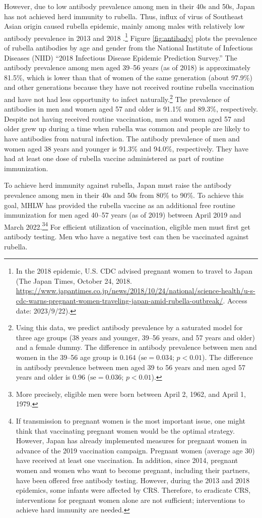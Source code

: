 \documentclass[
]{article}
\begin{document}
However, due to low antibody prevalence among men in their 40s and 50s, Japan has not achieved herd immunity to rubella. Thus, influx of virus of Southeast Asian origin caused rubella epidemic, mainly among males with relatively low antibody prevalence in 2013 and 2018 \citep{NIID2019}.\footnote{In the 2018 epidemic, U.S. CDC advised pregnant women to travel to Japan (The Japan Times, October 24, 2018. \url{https://www.japantimes.co.jp/news/2018/10/24/national/science-health/u-s-cdc-warns-pregnant-women-traveling-japan-amid-rubella-outbreak/}. Access date: 2023/9/22).} Figure \ref{fig:antibody} plots the prevalence of rubella antibodies by age and gender from the National Institute of Infectious Diseases (NIID) ``2018 Infectious Disease Epidemic Prediction Survey.'' The antibody prevalence among men aged 39--56 years (as of 2018) is approximately 81.5\%, which is lower than that of women of the same generation (about 97.9\%) and other generations because they have not received routine rubella vaccination and have not had less opportunity to infect naturally.\footnote{Using this data, we predict antibody prevalence by a saturated model for three age groups (38 years and younger, 39--56 years, and 57 years and older) and a female dummy. The difference in antibody prevalence between men and women in the 39--56 age group is \(0.164\) (\(\text{se} = 0.034\); \(p < 0.01\)). The difference in antibody prevalence between men aged 39 to 56 years and men aged 57 years and older is \(0.96\) (\(\text{se} = 0.036\); \(p < 0.01\)).} The prevalence of antibodies in men and women aged 57 and older is 91.1\% and 89.3\%, respectively. Despite not having received routine vaccination, men and women aged 57 and older grew up during a time when rubella was common and people are likely to have antibodies from natural infection. The antibody prevalence of men and women aged 38 years and younger is 91.3\% and 94.0\%, respectively. They have had at least one dose of rubella vaccine administered as part of routine immunization.

To achieve herd immunity against rubella, Japan must raise the antibody prevalence among men in their 40s and 50s from 80\% to 90\%. To achieve this goal, MHLW has provided the rubella vaccine as an additional free routine immunization for men aged 40--57 years (as of 2019) between April 2019 and March 2022.\footnote{More precisely, eligible men were born between April 2, 1962, and April 1, 1979.}\footnote{If transmission to pregnant women is the most important issue, one might think that vaccinating pregnant women would be the optimal strategy. However, Japan has already implemented measures for pregnant women in advance of the 2019 vaccination campaign. Pregnant women (average age 30) have received at least one vaccination. In addition, since 2014, pregnant women and women who want to become pregnant, including their partners, have been offered free antibody testing. However, during the 2013 and 2018 epidemics, some infants were affected by CRS. Therefore, to eradicate CRS, interventions for pregnant women alone are not sufficient; interventions to achieve hard immunity are needed.} For efficient utilization of vaccination, eligible men must first get antibody testing. Men who have a negative test can then be vaccinated against rubella.
\end{document}
